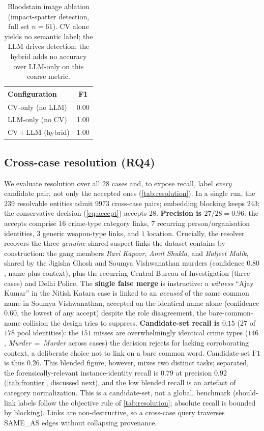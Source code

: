 \documentclass[conference]{IEEEtran}
\newcommand{\rel}[1]{\textup{\MakeUppercase{#1}}}
\begin{document}
\begin{table}[t]
  \centering
  \caption{Bloodstain image ablation (impact-spatter detection, full set $n{=}61$).
  CV alone yields no semantic label; the LLM drives detection; the hybrid adds no
  accuracy over LLM-only on this coarse metric.}
  \label{tab:bloodstainabl}
  \footnotesize
  \begin{tabular}{@{}lc@{}}
    \toprule
    \textbf{Configuration} & \textbf{F1} \\
    \midrule
    CV-only (no LLM)        & 0.00 \\
    LLM-only (no CV)        & 1.00 \\
    CV\,$+$\,LLM (hybrid)   & 1.00 \\
    \bottomrule
  \end{tabular}
\end{table}

\subsection{Cross-case resolution (RQ4)}
\label{sec:res_eval}
We evaluate resolution over all $28$ cases and, to expose recall, label
\emph{every} candidate pair, not only the accepted ones (\cref{tab:resolution}).
In a single run, the $239$ resolvable entities admit $9973$ cross-case pairs;
embedding blocking keeps $243$; the conservative decision (\cref{eq:accept})
accepts $28$. \textbf{Precision is $27/28=0.96$}: the accepts comprise $16$
crime-type category links, $7$ recurring person/organisation identities, $3$
generic weapon-type links, and $1$ location. Crucially, the resolver recovers the
three \emph{genuine} shared-suspect links the dataset contains by
construction: the gang members \emph{Ravi Kapoor}, \emph{Amit Shukla}, and
\emph{Baljeet Malik}, shared by the Jigisha Ghosh and Soumya Vishwanathan murders
(confidence $0.80$, name-plus-context), plus the recurring Central Bureau of
Investigation (three cases) and Delhi Police. The \textbf{single false merge} is
instructive: a \emph{witness} ``Ajay Kumar'' in the Nitish Katara case is linked to
an \emph{accused} of the same common name in Soumya Vishwanathan, accepted on the
identical name alone (confidence $0.60$, the lowest of any accept) despite the role
disagreement, the bare-common-name collision the design tries to suppress. \textbf{Candidate-set recall is $0.15$} ($27$ of $178$ pool identities):
the $151$ misses are overwhelmingly identical crime types ($146$,
\emph{Murder}\,$=$\,\emph{Murder} across cases) the decision rejects for lacking
corroborating context, a deliberate choice not to link on a bare common word.
Candidate-set $\mathrm{F1}$ is thus $0.26$. This blended figure, however, mixes two
distinct tasks; separated, the forensically-relevant instance-identity recall is
$0.79$ at precision $0.92$ (\cref{tab:frontier}, discussed next), and the low
blended recall is an artefact of category normalization. This is a candidate-set,
not a global, benchmark (should-link labels follow the objective rule of
\cref{tab:resolution}; absolute recall is bounded by blocking). Links are
non-destructive, so a cross-case query traverses \rel{same\_as} edges without
collapsing provenance.
\end{document}
